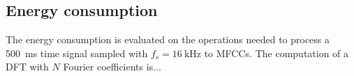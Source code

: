 
\subsection{Energy consumption}
The energy consumption is evaluated on the operations needed to process a \SI{500}{\milli\second} time signal sampled with $f_s = \SI{16}{\kilo\hertz}$ to MFCCs.
The computation of a DFT with $N$ Fourier coefficients is...









